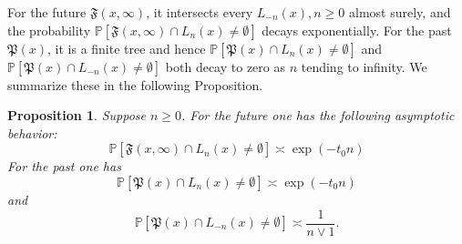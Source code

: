 \documentclass[12pt]{article}
\newtheorem{proposition}[theorem]{Proposition}
\numberwithin{equation}{section}
\newcommand{\be}{\begin{equation}}
\newcommand{\ee}{\end{equation}}
\newcommand{\1}{\mathbf{1}}
\begin{document}
For  the future $\mathfrak{F}(x,\infty)$, it intersects every $L_{-n}(x),n\geq0$ almost surely, and the probability $\mathbb{P}[\mathfrak{F}(x,\infty)\cap  L_n(x)\neq\emptyset]$ decays exponentially. For the past $\mathfrak{P}(x)$, it is a finite tree and hence $\mathbb{P}[\mathfrak{P}(x)\cap  L_n(x)\neq\emptyset]$ and $\mathbb{P}[\mathfrak{P}(x)\cap  L_{-n}(x)\neq\emptyset]$ both decay to zero as $n$ tending to infinity. We summarize these in the following Proposition.
\begin{proposition}\label{prop: exponentail decay for the past and future intersecting with a slab}
	Suppose $n\geq0$. For the future one has the following asymptotic behavior:
	\be\label{eq: exponential decay for future intersect a high slab}
	\mathbb{P}[\mathfrak{F}(x,\infty)\cap  L_n(x)\neq\emptyset]\asymp \exp(-t_0n)
	\ee
	For the past one has 
	\be\label{eq: exponential decay for past intersect a high slab}
	   \mathbb{P}[\mathfrak{P}(x)\cap  L_n(x)\neq\emptyset]\asymp \exp(-t_0n)
	\ee
	and
	\be\label{eq: polynomial decay for past intersect a low slab}
	\mathbb{P}[\mathfrak{P}(x)\cap  L_{-n}(x)\neq\emptyset]\asymp\frac{1}{n\vee 1}.
	\ee
	
	
	
\end{proposition}
\end{document}
